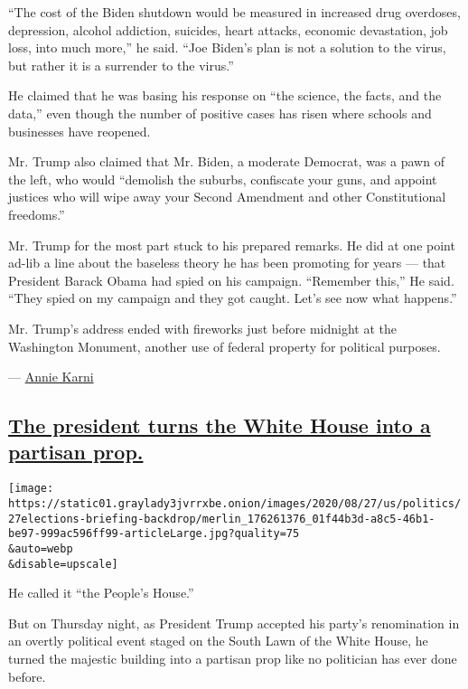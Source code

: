 ``The cost of the Biden shutdown would be measured in increased drug
overdoses, depression, alcohol addiction, suicides, heart attacks,
economic devastation, job loss, into much more,'' he said. ``Joe Biden's
plan is not a solution to the virus, but rather it is a surrender to the
virus.''

He claimed that he was basing his response on ``the science, the facts,
and the data,'' even though the number of positive cases has risen where
schools and businesses have reopened.

Mr. Trump also claimed that Mr. Biden, a moderate Democrat, was a pawn
of the left, who would ``demolish the suburbs, confiscate your guns, and
appoint justices who will wipe away your Second Amendment and other
Constitutional freedoms.''

Mr. Trump for the most part stuck to his prepared remarks. He did at one
point ad-lib a line about the baseless theory he has been promoting for
years --- that President Barack Obama had spied on his campaign.
``Remember this,'' He said. ``They spied on my campaign and they got
caught. Let's see now what happens.''

Mr. Trump's address ended with fireworks just before midnight at the
Washington Monument, another use of federal property for political
purposes.

--- \href{https://www.nytimes3xbfgragh.onion/by/annie-karni}{Annie
Karni}

\hypertarget{the-president-turns-the-white-house-into-a-partisan-prop}{%
\subsection{\texorpdfstring{\protect\hyperlink{the-president-turns-the-white-house-into-a-partisan-prop}{The
president turns the White House into a partisan
prop.}}{The president turns the White House into a partisan prop.}}\label{the-president-turns-the-white-house-into-a-partisan-prop}}

\texttt{[image: https://static01.graylady3jvrrxbe.onion/images/2020/08/27/us/politics/27elections-briefing-backdrop/merlin\_176261376\_01f44b3d-a8c5-46b1-be97-999ac596ff99-articleLarge.jpg?quality=75\\\&auto=webp\\\&disable=upscale]}

He called it ``the People's House.''

But on Thursday night, as President Trump accepted his party's
renomination in an overtly political event staged on the South Lawn of
the White House, he turned the majestic building into a partisan prop
like no politician has ever done before.

